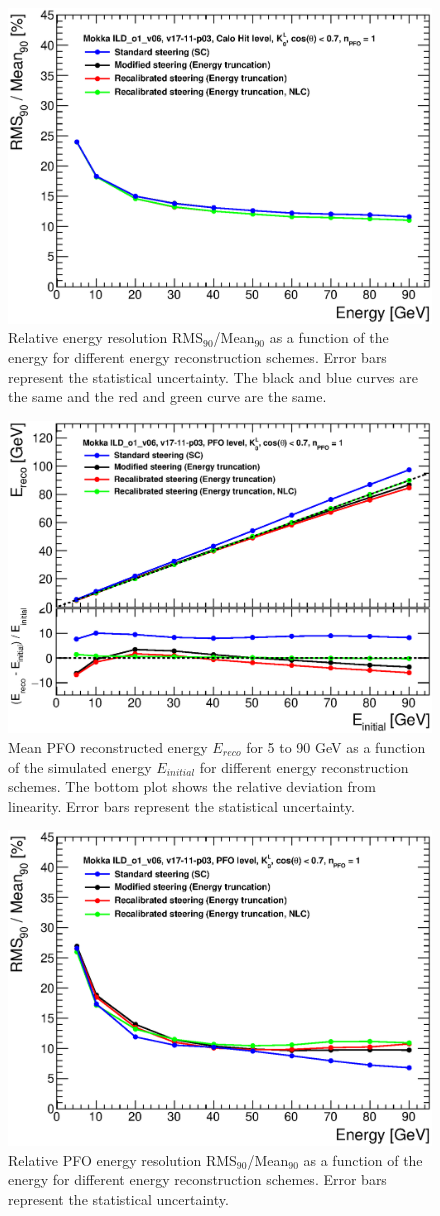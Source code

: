 \begin{figure}[htbp!]
  \centering
  \includegraphics[width=0.6\linewidth]{../Thesis_Plots/ILD/CheckCalib/Comparison_resolution_Curves_Hits.eps}
  \caption{Relative energy resolution RMS$_{90}$/Mean$_{90}$ as a function of the energy for different energy reconstruction schemes. Error bars represent the statistical uncertainty. The black and blue curves are the same and the red and green curve are the same.} \label{fig:resohits}
\end{figure}

\begin{figure}[htbp!]
  \centering
  \includegraphics[width=0.6\linewidth]{../Thesis_Plots/ILD/CheckCalib/Comparison_linearity_Curves_PFO.eps}
  \caption{Mean PFO reconstructed energy $E_{reco}$ for 5 to 90 GeV \kzeroL{} as a function of the simulated energy $E_{initial}$ for different energy reconstruction schemes. The bottom plot shows the relative deviation from linearity. Error bars represent the statistical uncertainty.} \label{fig:linpfo}
\end{figure}

\begin{figure}[htbp!]
  \centering
  \includegraphics[width=0.6\linewidth]{../Thesis_Plots/ILD/CheckCalib/Comparison_resolution_Curves_PFO.eps}
  \caption{Relative PFO energy resolution RMS$_{90}$/Mean$_{90}$ as a function of the energy for different energy reconstruction schemes. Error bars represent the statistical uncertainty.} \label{fig:resopfo}
\end{figure}


